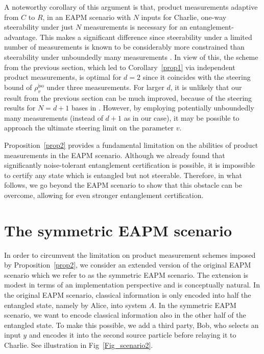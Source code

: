 \documentclass[aps,superscriptaddress,twocolumn,twoside,floatfix,pra,nofootinbib,a4paper]{revtex4-2}
\begin{document}
A noteworthy corollary of this argument is that,  product measurements adaptive from $C$ to $R$, in an EAPM scenario with $N$ inputs for Charlie, one-way steerability under just $N$ measurements is necessary for an entanglement-advantage. This makes a significant difference since steerability under a limited number of measurements is known to be considerably more constrained than steerability under unboundedly many measurements \cite{Bavaresco2017}.  In view of this, the scheme from the previous section, which led to Corollary~\ref{prop1} via independent product measurements, is optimal for $d=2$ since it coincides with the steering bound of $\rho_v^\text{iso}$ under three measurements.  For larger $d$, it is unlikely that our result from the previous section can be much improved, because of the steering results for $N=d+1$ bases in \cite{Marciniak2015, Designolle2019}. However, by employing potentially unboundedly many measurements (instead of $d+1$ as in our case), it may be possible to approach the ultimate steering limit  \cite{Wiseman2007} on the parameter $v$.

Proposition~\ref{prop2} provides a fundamental limitation on the abilities of product measurements in the EAPM scenario. Although we already found that significantly noise-tolerant entanglement certification is possible, it is impossible to certify any state which is entangled but not steerable. Therefore, in what follows, we go beyond the EAPM scenario to show that this obstacle can be overcome, allowing for even stronger entanglement certification.



\section{The symmetric EAPM scenario}\label{sec3}
In order to circumvent the limitation on product measurement schemes imposed by Proposition~\ref{prop2}, we consider an extended version \cite{Abbott2018, Piveteau2023} of the original EAPM scenario which we refer to as the symmetric EAPM scenario. The extension is modest in terms of an implementation perspective and is conceptually natural. In the original EAPM scenario, classical information is only encoded into half the entangled state, namely by Alice, into system $A$. In the symmetric EAPM scenario, we want to encode classical information also in the other half of the entangled state. To make this possible, we add a third party, Bob, who selects an input $y$ and encodes it into the second source particle before relaying it to Charlie. See illustration in Fig~\ref{Fig_scenario2}.
\end{document}
